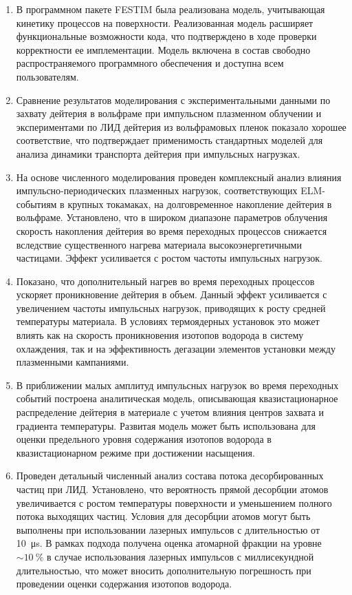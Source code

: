 \begin{enumerate}
  \item В программном пакете FESTIM была реализована модель, учитывающая кинетику процессов на поверхности. Реализованная модель расширяет функциональные возможности кода, что подтверждено в ходе проверки корректности ее имплементации. Модель включена в состав свободно распространяемого программного обеспечения и доступна всем пользователям.
  \item Сравнение результатов моделирования с экспериментальными данными по захвату дейтерия в вольфраме при импульсном плазменном облучении и экспериментами по ЛИД дейтерия из вольфрамовых пленок показало хорошее соответствие, что подтверждает применимость стандартных моделей для анализа динамики транспорта дейтерия при импульсных нагрузках.
  \item На основе численного моделирования проведен комплексный анализ влияния импульсно-периодических плазменных нагрузок, соответствующих ELM-событиям в крупных токамаках, на долговременное накопление дейтерия в вольфраме. Установлено, что в широком диапазоне параметров облучения скорость накопления дейтерия во время переходных процессов снижается вследствие существенного нагрева материала высокоэнергетичными частицами. Эффект усиливается с ростом частоты импульсных нагрузок. 
  \item Показано, что дополнительный нагрев во время переходных процессов ускоряет проникновение дейтерия в объем. Данный эффект усиливается с увеличением частоты импульсных нагрузок, приводящих к росту средней температуры материала. В условиях термоядерных установок это может влиять как на скорость проникновения изотопов водорода в систему охлаждения, так и на эффективность дегазации элементов установки между плазменными кампаниями.
  \item В приближении малых амплитуд импульсных нагрузок во время переходных событий построена аналитическая модель, описывающая квазистационарное распределение дейтерия в материале с учетом влияния центров захвата и градиента температуры. Развитая модель может быть использована для оценки предельного уровня содержания изотопов водорода в квазистационарном режиме при достижении насыщения.
  \item Проведен детальный численный анализ состава потока десорбированных частиц при ЛИД. Установлено, что вероятность прямой десорбции атомов увеличивается с ростом температуры поверхности и уменьшением полного потока выходящих частиц. Условия для десорбции атомов могут быть выполнены при использовании лазерных импульсов с длительностью от \SI{10}{\micro\second}. В рамках подхода получена оценка атомарной фракции на уровне \( \sim \SI{10}{\percent} \) в случае использования лазерных импульсов с миллисекундной длительностью, что может вносить дополнительную погрешность при проведении оценки содержания изотопов водорода.

\end{enumerate}

